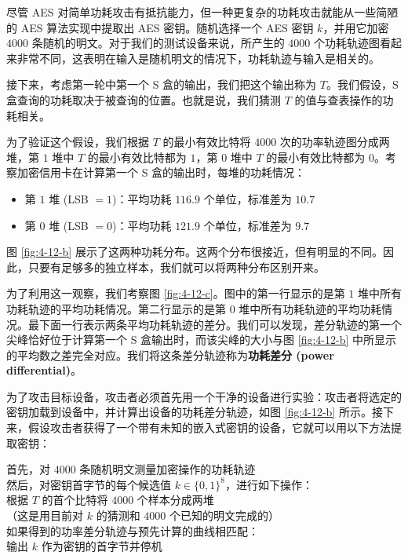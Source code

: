 \begin{snote}[差分功耗分析。]
尽管 AES 对简单功耗攻击有抵抗能力，但一种更复杂的功耗攻击就能从一些简陋的 AES 算法实现中提取出 AES 密钥。随机选择一个 AES 密钥 $k$，并用它加密 $4000$ 条随机的明文。对于我们的测试设备来说，所产生的 $4000$ 个功耗轨迹图看起来非常不同，这表明在输入是随机明文的情况下，功耗轨迹与输入是相关的。

接下来，考虑第一轮中第一个 S 盒的输出，我们把这个输出称为 $T$。我们假设，S 盒查询的功耗取决于被查询的位置。也就是说，我们猜测 $T$ 的值与查表操作的功耗相关。

为了验证这个假设，我们根据 $T$ 的最小有效比特将 $4000$ 次的功率轨迹图分成两堆，第 $1$ 堆中 $T$ 的最小有效比特都为 $1$，第 $0$ 堆中 $T$ 的最小有效比特都为 $0$。考察加密信用卡在计算第一个 S 盒的输出时，每堆的功耗情况：
\begin{itemize}
	\item 第 $1$ 堆 (LSB $=1$)：平均功耗 $116.9$ 个单位，标准差为 $10.7$
	\item 第 $0$ 堆 (LSB $=0$)：平均功耗 $121.9$ 个单位，标准差为 $9.7$
\end{itemize}
图 \ref{fig:4-12-b} 展示了这两种功耗分布。这两个分布很接近，但有明显的不同。因此，只要有足够多的独立样本，我们就可以将两种分布区别开来。

为了利用这一观察，我们考察图 \ref{fig:4-12-c}。图中的第一行显示的是第 $1$ 堆中所有功耗轨迹的平均功耗情况。第二行显示的是第 $0$ 堆中所有功耗轨迹的平均功耗情况。最下面一行表示两条平均功耗轨迹的差分。我们可以发现，差分轨迹的第一个尖峰恰好位于计算第一个 S 盒输出时，而该尖峰的大小与图 \ref{fig:4-12-b} 中所显示的平均数之差完全对应。我们将这条差分轨迹称为\textbf{功耗差分 (power differential)}。

为了攻击目标设备，攻击者必须首先用一个干净的设备进行实验：攻击者将选定的密钥加载到设备中，并计算出设备的功耗差分轨迹，如图 \ref{fig:4-12-b} 所示。接下来，假设攻击者获得了一个带有未知的嵌入式密钥的设备，它就可以用以下方法提取密钥：
 
\vspace*{5pt}

\hspace*{5pt} 首先，对 $4000$ 条随机明文测量加密操作的功耗轨迹\\
\hspace*{26pt} 然后，对密钥首字节的每个候选值 $k\in\{0,1\}^8$，进行如下操作：\\
\hspace*{50pt} 根据 $T$ 的首个比特将 $4000$ 个样本分成两堆\\
\hspace*{75pt} （这是用目前对 $k$ 的猜测和 $4000$ 个已知的明文完成的）\\
\hspace*{50pt} 如果得到的功率差分轨迹与预先计算的曲线相匹配：\\
\hspace*{75pt} 输出 $k$ 作为密钥的首字节并停机


\end{snote}
